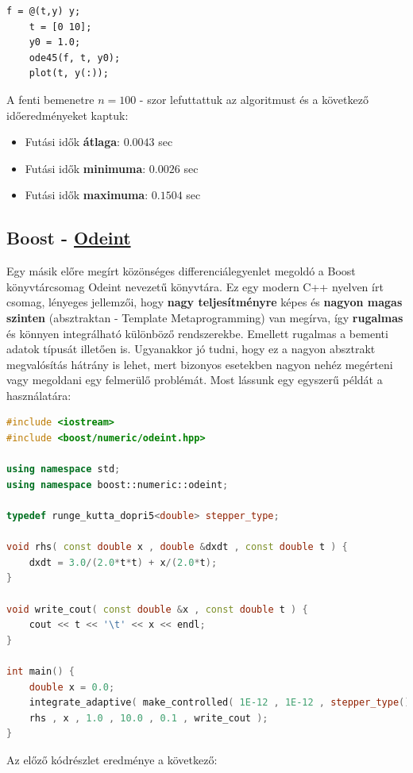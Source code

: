 \begin{lstlisting}[caption={Matlab példakód diff. egyenlet megoldására.}, captionpos=b]
	f = @(t,y) y;
	t = [0 10];
	y0 = 1.0;
	ode45(f, t, y0);
	plot(t, y(:));
\end{lstlisting}


A fenti bemenetre $ n = 100 $ - szor lefuttattuk az algoritmust és a következő időeredményeket kaptuk:
\begin{itemize}
	\item Futási idők \textbf{átlaga}: $ 0.0043 $ sec
	\item Futási idők \textbf{minimuma}: $ 0.0026 $ sec
	\item Futási idők \textbf{maximuma}: $ 0.1504 $ sec
\end{itemize}




\begin{center}
\end{center}

\subsection {Boost - \href{http://headmyshoulder.github.io/odeint-v2/}{Odeint}} \label{BoostOdeint}

Egy másik előre megírt közönséges differenciálegyenlet megoldó a Boost könyvtárcsomag Odeint nevezetű könyvtára. Ez egy modern C++ nyelven írt csomag, lényeges jellemzői, hogy \textbf{nagy teljesítményre} képes és \textbf{nagyon magas szinten} (absztraktan - Template Metaprogramming) van megírva, így \textbf{rugalmas} és könnyen integrálható különböző rendszerekbe. Emellett rugalmas a bementi adatok típusát illetően is. Ugyanakkor jó tudni, hogy ez a nagyon absztrakt megvalósítás hátrány is lehet, mert bizonyos esetekben nagyon nehéz megérteni vagy megoldani egy felmerülő problémát. Most lássunk egy egyszerű példát a használatára:

\begin{lstlisting}[caption={Odeint példakód.}, captionpos=b, language = C++]
#include <iostream>
#include <boost/numeric/odeint.hpp>

using namespace std;
using namespace boost::numeric::odeint;

typedef runge_kutta_dopri5<double> stepper_type;

void rhs( const double x , double &dxdt , const double t ) {
	dxdt = 3.0/(2.0*t*t) + x/(2.0*t);
}

void write_cout( const double &x , const double t ) {
	cout << t << '\t' << x << endl;
}

int main() {
	double x = 0.0;    
	integrate_adaptive( make_controlled( 1E-12 , 1E-12 , stepper_type() ) ,
	rhs , x , 1.0 , 10.0 , 0.1 , write_cout );
}
\end{lstlisting}
\pagebreak
Az előző kódrészlet eredménye a következő:



